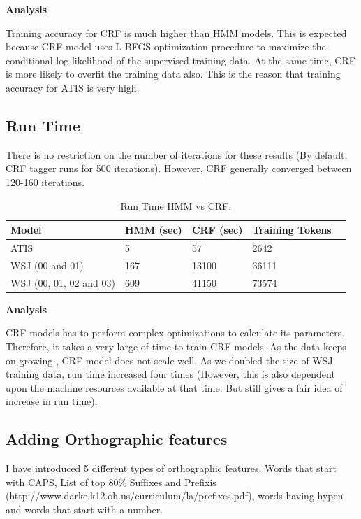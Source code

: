 {\bfseries Analysis}

Training accuracy for CRF is much higher than HMM models. This is expected because CRF model uses L-BFGS optimization procedure to maximize the conditional log likelihood of the supervised training data. At the same time, CRF is more likely to overfit the training data also. This is the reason that training accuracy for ATIS is very high.

\subsection {Run Time}

There is no restriction on the number of iterations for these results (By default, CRF tagger runs for 500 iterations). However, CRF generally converged between 120-160 iterations.

\begin{center}	
	\begin{table}[ht]
  	\centering
   	\begin{tabular}{| l | l | l | l | l |}
    	\hline
        Model & HMM (sec) & CRF (sec) & Training Tokens \\ \hline
        ATIS & 5 & 57 & 2642\\ \hline
        WSJ (00 and 01) & 167 & 13100 & 36111 \\ \hline
	WSJ (00, 01, 02 and 03) & 609 & 41150 & 73574 \\ \hline
    	\end{tabular}
    	\caption{Run Time HMM vs CRF. }
    	\end{table}%
\end{center}
{\bfseries Analysis}

CRF models has to perform complex optimizations to calculate its parameters. Therefore, it takes a very large of time to train CRF models. As the data keeps on growing , CRF model does not scale well. As we doubled the size of WSJ training data, run time increased four times (However, this is also dependent upon the machine resources available at that time. But still gives a fair idea of increase in run time). 

\subsection {Adding Orthographic features}

I have introduced 5 different types of orthographic features. Words that start with CAPS, List of top 80\% Suffixes and Prefixis (http://www.darke.k12.oh.us/curriculum/la/prefixes.pdf), words having hypen and words that start with a number.  

